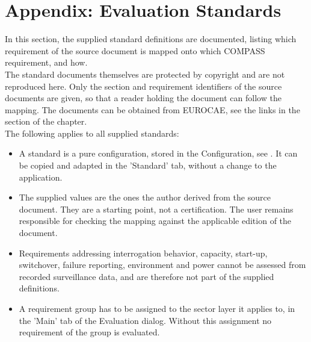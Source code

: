 \section{Appendix: Evaluation Standards}
\label{sec:appendix_eval_standards}

In this section, the supplied standard definitions are documented, listing which requirement of the source document is mapped onto which COMPASS requirement, and how. \\

The standard documents themselves are protected by copyright and are not reproduced here. Only the section and requirement identifiers of the source documents are given, so that a reader holding the document can follow the mapping. The documents can be obtained from EUROCAE, see the links in the  section of the  chapter. \\

The following applies to all supplied standards:
\begin{itemize}
\item A standard is a pure configuration, stored in the Configuration, see . It can be copied and adapted in the 'Standard' tab, without a change to the application.
\item The supplied values are the ones the author derived from the source document. They are a starting point, not a certification. The user remains responsible for checking the mapping against the applicable edition of the document.
\item Requirements addressing interrogation behavior, capacity, start-up, switchover, failure reporting, environment and power cannot be assessed from recorded surveillance data, and are therefore not part of the supplied definitions.
\item A requirement group has to be assigned to the sector layer it applies to, in the 'Main' tab of the Evaluation dialog. Without this assignment no requirement of the group is evaluated.
\end{itemize}
\ \\








